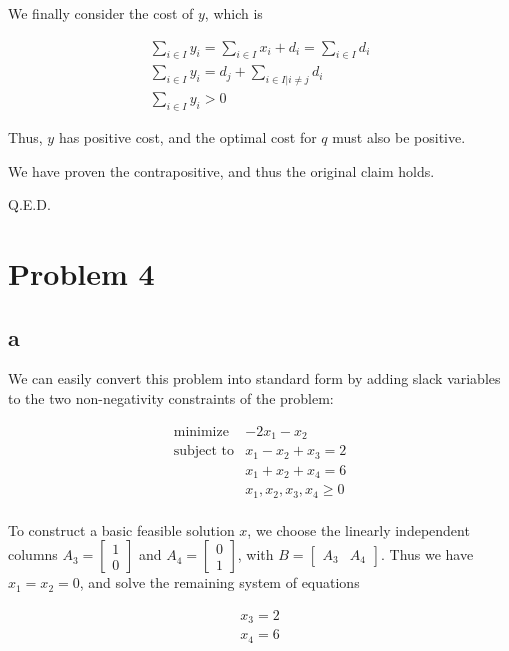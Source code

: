 \documentclass[11pt,a4paper]{article}
\begin{document}
We finally consider the cost of $y$, which is

\begin{equation}
\begin{split}
\sum_{i\in I} y_i =\sum_{i\in I} x_i+d_i=\sum_{i\in I}d_i\\
\sum_{i\in I} y_i = d_j +\sum_{i\in I|i\neq j}d_i\\
\sum_{i\in I} y_i > 0
\end{split}
\end{equation}

Thus, $y$ has positive cost, and the optimal cost for $q$ must also be positive.

We have proven the contrapositive, and thus the original claim holds.

Q.E.D.

\section{Problem 4}
\subsection{a}

We can easily convert this problem into standard form by adding slack variables to the two non-negativity constraints of the problem:

$$
\begin{array}{ll}
\text{minimize}  & -2x_1-x_2\\
\text{subject to}& x_1-x_2+x_3=2\\
                 & x_1+x_2+x_4=6\\
                 & x_1, x_2, x_3, x_4\geq 0\\
\end{array}
$$

To construct a basic feasible solution $x$, we choose the linearly independent columns $A_3=\begin{bmatrix}1\\0\end{bmatrix}$ and $A_4=\begin{bmatrix}0\\1\end{bmatrix}$, with $B=\begin{bmatrix}A_3 & A_4\end{bmatrix}$. Thus we have $x_1=x_2=0$, and solve the remaining system of equations

$$
\begin{array}{c}
x_3=2\\
x_4=6\\
\end{array}
$$
\end{document}
